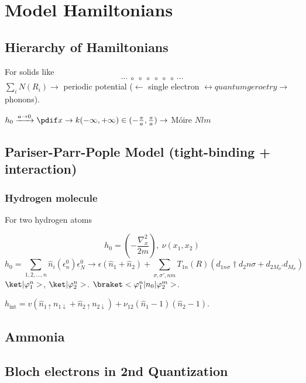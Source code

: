 
\chapter{Model Hamiltonians}

\section{Hierarchy of Hamiltonians}

For solids like
\[\cdots ~ \circ ~ \circ ~ \circ ~ \circ ~ \circ ~ \circ ~ \cdots\]
$\sum_i N(R_i) \to$ periodic potential ($\leftarrow$ single electron $\leftrightarrow quantum geroetry \to $ phonons).

$h_0 \xrightarrow{a\to0}\pdif x \to k(-\infty,+\infty) \in (-\frac\pi a,\frac\pi a) \to$ Móire $N l m$

\section{Pariser-Parr-Pople Model (tight-binding + interaction)}

\subsection{Hydrogen molecule}

For two hydrogen atoms
\begin{center}
\end{center}
\[h_0 = (-\frac{\nabla_x^2}{2m}),~ \nu(x_1,x_2)\]
\[h_0 = \sum_{1,2,...,n} \hat n_i(\epsilon_n^0) \epsilon_N^0 \to \epsilon(\hat n_1 + \hat n_2)
  + \sum_{\sigma,\sigma',nm}T_{1n}(R) (d_{1n\sigma}\dagger d_2n\sigma + d_{2M_\sigma'}d_{M_\sigma})\]
$\ket|\varphi_1^n>$, $\ket|\varphi_2^n>$. $\braket<\varphi_1^n|n_0|\varphi_2^m>$.

$h_\text{int} = v(\hat n_{1\uparrow}n_{1\downarrow} + \hat n_{2\uparrow}n_{2\downarrow}) + \nu_{12}(\hat n_1 - 1)(\hat n_2 - 1)$.

\section{Ammonia }

\section{Bloch electrons in 2nd Quantization}

